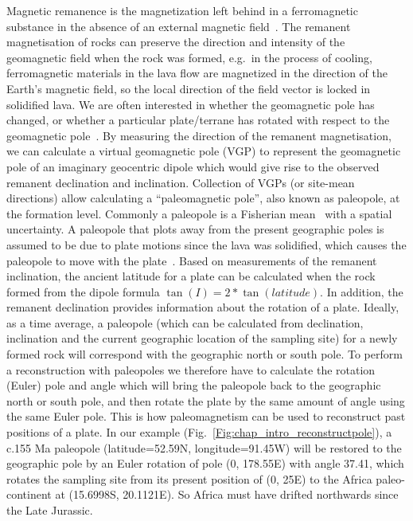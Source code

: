 Magnetic remanence is the magnetization left behind in a ferromagnetic substance
in the absence of an external magnetic field~\cite{T19}. The remanent
magnetisation of rocks can preserve the direction and intensity of the
geomagnetic field when the rock was formed, e.g.\ in the process of cooling,
ferromagnetic materials in the lava flow are magnetized in the direction of the
Earth's magnetic field, so the local direction of the field vector is locked in
solidified lava. We are often interested in whether the geomagnetic pole has
changed, or whether a particular plate/terrane has rotated with respect to the
geomagnetic pole~\cite{T19}. By measuring the direction of the remanent
magnetisation, we can calculate a virtual geomagnetic pole (VGP) to represent
the geomagnetic pole of an imaginary geocentric dipole which would give rise to
the observed remanent declination and inclination. Collection of VGPs (or
site-mean directions) allow calculating a ``paleomagnetic pole'', also known as
paleopole, at the formation level. Commonly a paleopole is a Fisherian
mean~\cite{F53} with a spatial uncertainty. A paleopole that plots away from the
present geographic poles is assumed to be due to plate motions since the lava
was solidified, which causes the paleopole to move with the plate~\cite{T08}.
Based on measurements of the remanent inclination, the ancient latitude for a
plate can be calculated when the rock formed from the dipole formula $\tan(I) =
2 *\tan(latitude)$. In addition, the remanent declination provides information
about the rotation of a plate. Ideally, as a time average, a paleopole (which
can be calculated from declination, inclination and the current geographic
location of the sampling site) for a newly formed rock will correspond with the
geographic north or south pole. To perform a reconstruction with paleopoles we
therefore have to calculate the rotation (Euler) pole and angle which will bring
the paleopole back to the geographic north or south pole, and then rotate the
plate by the same amount of angle using the same Euler pole. This is how
paleomagnetism can be used to reconstruct past positions of a plate. In our
example (Fig.~\ref{Fig:chap_intro_reconstructpole}), a c.155 Ma paleopole
(latitude=52.59\degree{}N, longitude=91.45\degree{}W) will be restored to the
geographic pole by an Euler rotation of pole (0\degree, 178.55\degree{}E) with
angle 37.41\degree, which rotates the sampling site from its present position of
(0\degree, 25\degree{}E) to the Africa paleo-continent at (15.6998\degree{}S,
20.1121\degree{}E). So Africa must have drifted northwards since the Late
Jurassic.

